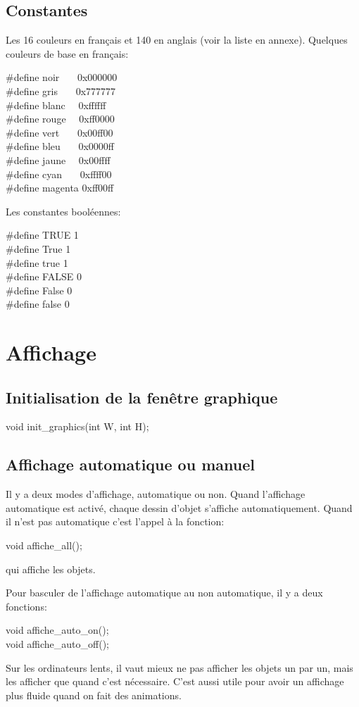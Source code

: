 \documentclass{report}
\newcommand\code[1]{
\begin{mdframed}[linecolor=purple,backgroundcolor=blue!10]
{\tt
#1
}
\end{mdframed}
}
\begin{document}
\subsection{Constantes}

Les 16 couleurs en français et 140 en anglais (voir la liste en annexe).
Quelques couleurs de base en français:
\code{
\#define noir~~~ 0x000000 \\
\#define gris~~~ 0x777777 \\
\#define blanc~~ 0xffffff \\
\#define rouge~~ 0xff0000 \\
\#define vert~~~ 0x00ff00 \\
\#define bleu~~~ 0x0000ff \\
\#define jaune~~ 0x00ffff \\
\#define cyan~~~ 0xffff00 \\
\#define magenta 0xff00ff
}

Les constantes booléennes:
\code{
\#define TRUE 1 \\
\#define True 1 \\
\#define true 1 \\
\#define FALSE 0 \\
\#define False 0 \\
\#define false 0 
}


\section{Affichage}
\subsection{Initialisation de la fenêtre graphique}

\code{
void init\_graphics(int W, int H);
}

\subsection{Affichage automatique ou manuel}
\label{sec:aam}
Il y a deux modes d'affichage, automatique ou non. Quand l'affichage 
automatique est activé, chaque dessin d'objet s'affiche automatiquement. 
Quand il n'est pas automatique c'est l'appel à la fonction:
\code{
void affiche\_all();
}
qui affiche les objets.

Pour basculer de l'affichage automatique au non automatique, il y a 
deux fonctions:
\code{
void affiche\_auto\_on(); \\
void affiche\_auto\_off();
}
Sur les ordinateurs lents, il vaut mieux ne pas afficher 
les objets un par un, mais les afficher que quand c'est nécessaire.
C'est aussi utile pour avoir un affichage plus fluide quand on fait
des animations.
\end{document}
